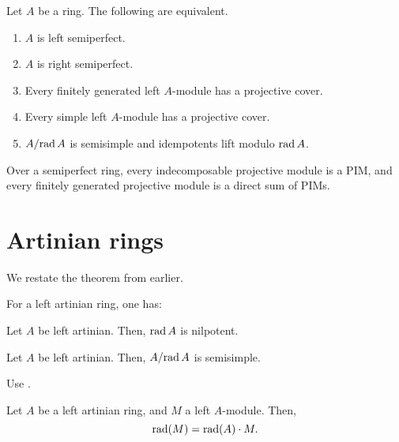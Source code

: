 \documentclass[12pt]{article}
\begin{document}
\begin{thm}
	Let $A$ be a ring. The following are equivalent.
	\begin{enumerate}[label=(\alph*)]
		\item $A$ is left semiperfect.
		\item $A$ is right semiperfect.
		\item Every finitely generated left $A$-module has a projective cover. 
		\item Every simple left $A$-module has a projective cover. 
		\item $A/{\operatorname{rad} A}$ is semisimple and idempotents lift modulo $\operatorname{rad} A$.
	\end{enumerate}
\end{thm}

\begin{thm}
	Over a semiperfect ring, every indecomposable projective module is a PIM, 
	and every finitely generated projective module is a direct sum of PIMs.
\end{thm}

\section{Artinian rings}

We restate the theorem from earlier.

\begin{thm}
	For a left artinian ring, one has:

\end{thm}

\begin{thm}
	Let $A$ be left artinian. Then, $\operatorname{rad} A$ is nilpotent.
\end{thm}

\begin{thm}
	Let $A$ be left artinian. Then, $A/{\operatorname{rad} A}$ is semisimple.
\end{thm}
\begin{sketch}
Use .
\end{sketch}

\begin{thm} \label{thm:radical-module-over-artinian}
	Let $A$ be a left artinian ring, and $M$ a left $A$-module. 
	Then,
	\begin{equation*} 
		\operatorname{rad}(M) = \operatorname{rad}(A) \cdot M.
	\end{equation*}
\end{thm}
\end{document}
